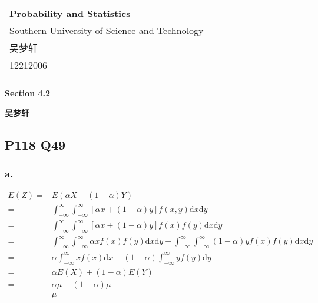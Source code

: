\documentclass[a4paper,12pt]{ctexart}
\begin{document}
\thispagestyle{empty} %

\begin{tabular}{p{15.5cm}}
{\large \bf Probability and Statistics} \\
Southern University of Science and Technology \\ 吴梦轩 \\ 12212006 \\
\hline
\\
\end{tabular}

\vspace*{0.3cm} %

\begin{center}
	{\Large \bf Section 4.2}
	\vspace{2mm}

	{\bf 吴梦轩}
		
\end{center}  

\vspace{0.4cm}

\subsection*{P118 Q49}

\subsubsection*{a.}

\begin{align*}
	E(Z) =& E(\alpha X + (1 - \alpha) Y) \\
	     =& \int_{-\infty}^{\infty} \int_{-\infty}^{\infty} [\alpha x + (1 - \alpha) y] f(x, y) \mathrm{d}x \mathrm{d}y \\
		 =& \int_{-\infty}^{\infty} \int_{-\infty}^{\infty} [\alpha x + (1 - \alpha) y] f(x) f(y) \mathrm{d}x \mathrm{d}y \\
		 =& \int_{-\infty}^{\infty} \int_{-\infty}^{\infty} \alpha x f(x) f(y) \mathrm{d}x \mathrm{d}y + \int_{-\infty}^{\infty} \int_{-\infty}^{\infty} (1 - \alpha) y f(x) f(y) \mathrm{d}x \mathrm{d}y \\
		 =& \alpha \int_{-\infty}^{\infty} x f(x) \mathrm{d}x + (1 - \alpha) \int_{-\infty}^{\infty} y f(y) \mathrm{d}y \\
		 =& \alpha E(X) + (1 - \alpha) E(Y) \\
		 =& \alpha \mu + (1 - \alpha) \mu \\
		 =& \mu
\end{align*}
\end{document}
